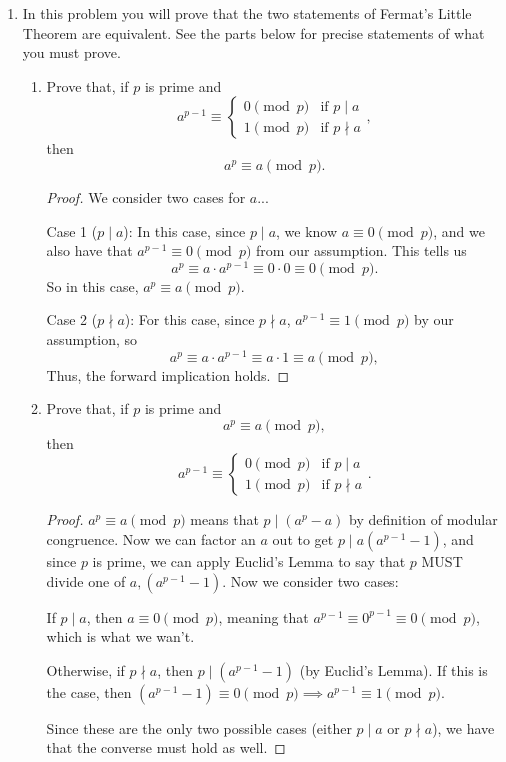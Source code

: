 \documentclass[11pt]{article}
\newcommand{\Z}{\mathbb{Z}}
\newcommand{\n}{\vspace{0.3cm}}
\begin{document}
\begin{enumerate}
\begin{proof}
    Since, for all \(r,t \in \Z\), \(r^{16} + 17t \equiv 1 \pmod{17}\), we can conclude that the equation \(r^{16} + 17t = 11\) has no integer solutions.
  \end{proof} \n
  

\item In this problem you will prove that the two statements of Fermat's Little Theorem are equivalent. See the parts below for precise statements of what you must prove. 
\begin{enumerate}
\item Prove that,  if \(p\) is prime and $$a^{p-1}\equiv \begin{cases} 0 \pmod{p} & \text{if } p\mid a \\ 1 \pmod{p} & \text{if } p\nmid a \end{cases},$$ then $$a^p\equiv a\pmod{p}.$$
  \begin{proof}
    We consider two cases for \(a\)...

    Case 1 (\(p \mid a\)):  In this case, since \(p \mid a\), we know \(a \equiv 0 \pmod p\), and we also have that \(a^{p-1} \equiv 0 \pmod p\) from our assumption.  This tells us
    \[a^p \equiv a \cdot a^{p-1} \equiv 0 \cdot 0 \equiv 0 \pmod p.\]
    So in this case, \(a^p \equiv a \pmod p\).

    Case 2 (\(p \nmid a\)):  For this case, since \(p \nmid a\), \(a^{p-1} \equiv 1 \pmod p\) by our assumption, so
    \[a^p \equiv a \cdot a^{p-1} \equiv a \cdot 1 \equiv a \pmod p,\]
    Thus, the forward implication holds.
  \end{proof}
  
\item Prove that, if \(p\) is prime and $$a^p\equiv a\pmod{p},$$ then $$a^{p-1}\equiv \begin{cases} 0 \pmod{p} & \text{if } p\mid a \\ 1 \pmod{p} & \text{if } p\nmid a \end{cases}.$$
  \begin{proof}
    \(a^p \equiv a \pmod p\) means that \(p \mid (a^p - a)\) by definition of modular congruence.  Now we can factor an \(a\) out to get \(p \mid a(a^{p-1}-1)\), and since \(p\) is prime, we can apply Euclid's Lemma to say that \(p\) MUST divide one of \(a, (a^{p-1}-1)\).  Now we consider two cases: \n

    If \(p \mid a\), then \(a \equiv 0 \pmod p\), meaning that \(a^{p-1} \equiv 0^{p-1} \equiv 0 \pmod p\), which is what we wan't. \n

    Otherwise, if \(p \nmid a\), then \(p \mid (a^{p-1}-1)\) (by Euclid's Lemma).  If this is the case, then \((a^{p-1}-1) \equiv 0 \pmod p \implies a^{p-1} \equiv 1 \pmod p\). \n

    Since these are the only two possible cases (either \(p \mid a\) or \(p \nmid a\)), we have that the converse must hold as well.
  \end{proof}
  
\end{enumerate}

\end{enumerate}
\end{document}
